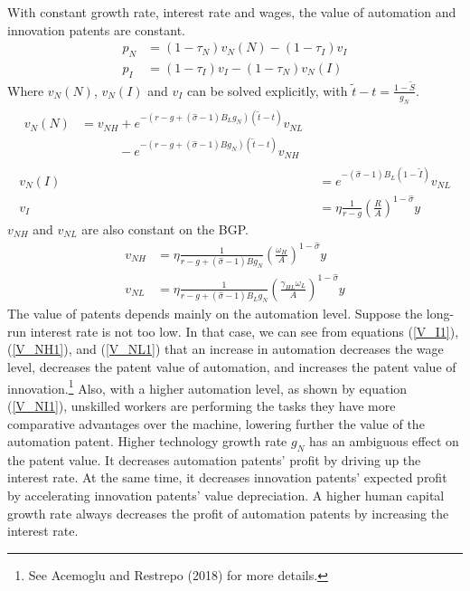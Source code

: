 \documentclass[12pt]{article}
\begin{document}
With constant growth rate, interest rate and wages, the value of automation and innovation patents are constant. 
\begin{align*}
p_N &= (1-\tau_N)v_N(N)-(1-\tau_I)v_I\\
p_I &= (1-\tau_I)v_I-(1-\tau_N)v_N(I) 
\end{align*}
Where $v_N(N)$, $v_N(I)$ and $v_I$ can be solved explicitly, with $\tilde{t}-t =\frac{1-\tilde{S}}{g_N}$.
\begin{align}
\label{V_NN1}
\begin{split}
v_N(N) &= v_{NH}+e^{-(r-g+(\hat{\sigma}-1)B_Lg_N)(\tilde{t}-t)}v_{NL} \\
&\quad \quad \quad -e^{-(r-g+(\hat{\sigma}-1)Bg_N)(\tilde{t}-t)}v_{NH} 
\end{split} \\
\label{V_NI1} 
v_N(I) &=e^{-(\hat{\sigma}-1)B_L(1-\tilde{I})}v_{NL} \\
\label{V_I1}
v_I &= \eta\frac{1}{r-g}(\frac{R}{A})^{1-\hat{\sigma}}y
\end{align}
$v_{NH}$ and $v_{NL}$ are also constant on the BGP. 
\begin{align}
\label{V_NH1} 
v_{NH} &= \eta\frac{1}{r-g+(\hat{\sigma}-1)Bg_N}(\frac{\omega_H}{A})^{1-\hat{\sigma}}y \\
\label{V_NL1} 
v_{NL} &=\eta \frac{1}{r-g+(\hat{\sigma}-1)B_Lg_N}(\frac{\gamma_{HL}\omega_L}{A})^{1-\hat{\sigma}}y 
\end{align}
The value of patents depends mainly on the automation level. Suppose the long-run interest rate is not too low. In that case, we can see from equations (\ref{V_I1}), (\ref{V_NH1}), and (\ref{V_NL1}) that an increase in automation decreases the wage level, decreases the patent value of automation, and increases the patent value of innovation.\footnote{See Acemoglu and Restrepo (2018)\cite{AcemogluRestrepo2018} for more details.} Also, with a higher automation level, as shown by equation (\ref{V_NI1}), unskilled workers are performing the tasks they have more comparative advantages over the machine, lowering further the value of the automation patent. Higher technology growth rate $g_N$ has an ambiguous effect on the patent value. It decreases automation patents' profit by driving up the interest rate. At the same time, it decreases innovation patents' expected profit by accelerating innovation patents' value depreciation. A higher human capital growth rate always decreases the profit of automation patents by increasing the interest rate. 
\end{document}
